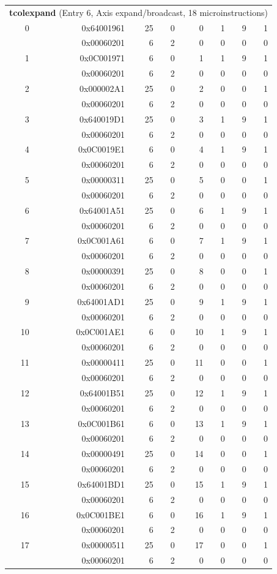 \begin{longtable}{r r r r r r r r}
\multicolumn{8}{l}{\textbf{tcolexpand} (Entry 6, Axis expand/broadcast, 18 microinstructions)} \\
0 & 0x64001961 & 25 & 0 & 0 & 1 & 9 & 1 \\
  & 0x00060201 & 6 & 2 & 0 & 0 & 0 & 0 \\
1 & 0x0C001971 & 6 & 0 & 1 & 1 & 9 & 1 \\
  & 0x00060201 & 6 & 2 & 0 & 0 & 0 & 0 \\
2 & 0x000002A1 & 25 & 0 & 2 & 0 & 0 & 1 \\
  & 0x00060201 & 6 & 2 & 0 & 0 & 0 & 0 \\
3 & 0x640019D1 & 25 & 0 & 3 & 1 & 9 & 1 \\
  & 0x00060201 & 6 & 2 & 0 & 0 & 0 & 0 \\
4 & 0x0C0019E1 & 6 & 0 & 4 & 1 & 9 & 1 \\
  & 0x00060201 & 6 & 2 & 0 & 0 & 0 & 0 \\
5 & 0x00000311 & 25 & 0 & 5 & 0 & 0 & 1 \\
  & 0x00060201 & 6 & 2 & 0 & 0 & 0 & 0 \\
6 & 0x64001A51 & 25 & 0 & 6 & 1 & 9 & 1 \\
  & 0x00060201 & 6 & 2 & 0 & 0 & 0 & 0 \\
7 & 0x0C001A61 & 6 & 0 & 7 & 1 & 9 & 1 \\
  & 0x00060201 & 6 & 2 & 0 & 0 & 0 & 0 \\
8 & 0x00000391 & 25 & 0 & 8 & 0 & 0 & 1 \\
  & 0x00060201 & 6 & 2 & 0 & 0 & 0 & 0 \\
9 & 0x64001AD1 & 25 & 0 & 9 & 1 & 9 & 1 \\
  & 0x00060201 & 6 & 2 & 0 & 0 & 0 & 0 \\
10 & 0x0C001AE1 & 6 & 0 & 10 & 1 & 9 & 1 \\
  & 0x00060201 & 6 & 2 & 0 & 0 & 0 & 0 \\
11 & 0x00000411 & 25 & 0 & 11 & 0 & 0 & 1 \\
  & 0x00060201 & 6 & 2 & 0 & 0 & 0 & 0 \\
12 & 0x64001B51 & 25 & 0 & 12 & 1 & 9 & 1 \\
  & 0x00060201 & 6 & 2 & 0 & 0 & 0 & 0 \\
13 & 0x0C001B61 & 6 & 0 & 13 & 1 & 9 & 1 \\
  & 0x00060201 & 6 & 2 & 0 & 0 & 0 & 0 \\
14 & 0x00000491 & 25 & 0 & 14 & 0 & 0 & 1 \\
  & 0x00060201 & 6 & 2 & 0 & 0 & 0 & 0 \\
15 & 0x64001BD1 & 25 & 0 & 15 & 1 & 9 & 1 \\
  & 0x00060201 & 6 & 2 & 0 & 0 & 0 & 0 \\
16 & 0x0C001BE1 & 6 & 0 & 16 & 1 & 9 & 1 \\
  & 0x00060201 & 6 & 2 & 0 & 0 & 0 & 0 \\
17 & 0x00000511 & 25 & 0 & 17 & 0 & 0 & 1 \\
  & 0x00060201 & 6 & 2 & 0 & 0 & 0 & 0 \\


\end{longtable}
